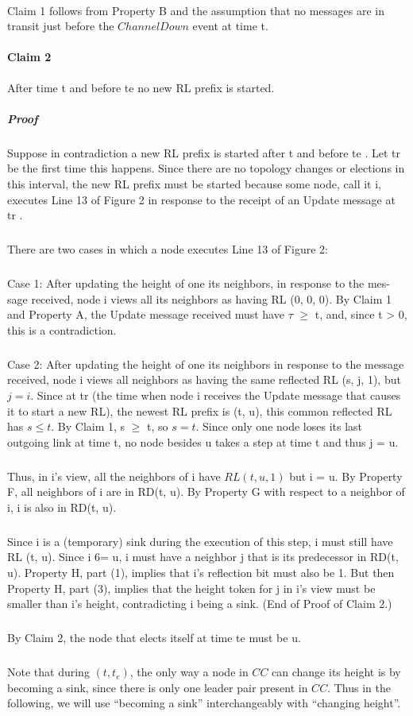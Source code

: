 \paragraph{}Claim 1 follows from Property B and the assumption that no messages are in transit just before the $ChannelDown$ event at time t. \paragraph{Claim 2}After time t and before te no new RL prefix is started.
\subparagraph{Proof}Suppose in contradiction a new RL prefix is started after t and before te . Let tr be the first time this happens. Since there are no topology changes or elections in this interval, the new RL prefix must be started because some node, call it i, executes Line 13 of Figure 2 in response to the receipt of an Update message at tr .
\subparagraph{}There are two cases in which a node executes Line 13 of Figure 2:
\subparagraph{}Case 1: After updating the height of one its neighbors, in response to the mes- sage received, node i views all its neighbors as having RL (0, 0, 0). By Claim 1 and Property A, the Update message received must have $\tau$ $\geq$ t, and, since t > 0, this is a contradiction.
\subparagraph{}Case 2: After updating the height of one its neighbors in response to the message received, node i views all neighbors as having the same reflected RL (s, j, 1), but $j = i$. Since at tr (the time when node i receives the Update message that causes it to start a new RL), the newest RL prefix is (t, u), this common reflected RL has $s \leq t$. By Claim 1, s $\geq$ t, so $s = t$. Since only one node loses its last outgoing link at time t, no node besides u takes a step at time t and thus j = u.
\subparagraph{}Thus, in i’s view, all the neighbors of i have $RL (t, u, 1)$ but i = u. By Property F, all neighbors of i are in RD(t, u). By Property G with respect to a neighbor of i, i is also in RD(t, u).
\subparagraph{}Since i is a (temporary) sink during the execution of this step, i must still have RL (t, u). Since i 6= u, i must have a neighbor j that is its predecessor in RD(t, u). Property H, part (1), implies that i’s reflection bit must also be 1. But then Property H, part (3), implies that the height token for j in i’s view must be smaller than i’s height, contradicting i being a sink. (End of Proof of Claim 2.)
\subparagraph{}By Claim 2, the node that elects itself at time te must be u.
\subparagraph{}Note that during $(t,t_e)$, the only way a node in $CC$ can change its height is by becoming a sink, since there is only one leader pair present in $CC$. Thus in the following, we will use “becoming a sink” interchangeably with “changing height”.
